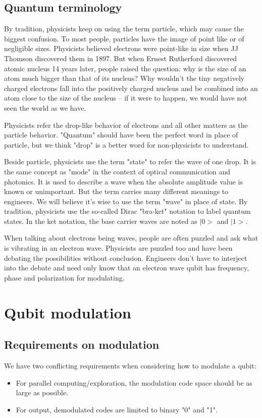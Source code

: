 \documentclass{book}
\begin{document}
\subsection{Quantum terminology}
By tradition, physicists keep on using the term particle, which may cause the biggest confusion. To most people, particles have the image of point like or of negligible sizes. Physicists believed electrons were point-like in size when JJ Thomson discovered them in 1897. But when Ernest Rutherford discovered atomic nucleus 14 years later, people raised the question: why is the size of an atom much bigger than that of its nucleus? Why wouldn't the tiny negatively charged electrons fall into the positively charged nucleus and be combined into an atom close to the size of the nucleus -- if it were to happen, we would have not seen the world as we have.

Physicists refer the drop-like behavior of electrons and all other matters as the particle behavior. "Quantum" should have been the perfect word in place of particle, but we think "drop" is a better word for non-physicists to understand.

Beside particle, physicists use the term "state" to refer the wave of one drop. It is the same concept as "mode" in the context of optical communication and photonics. It is used to describe a wave when the absolute amplitude value is known or unimportant. But the term carries many different meanings to engineers. We will believe it's wise to use the term "wave" in place of state. By tradition, physicists use the so-called Dirac "bra-ket" notation to label quantum states. In the ket notation, the base carrier waves are noted as $|0>$ and $|1>$.

When talking about electrons being waves, people are often puzzled and ask what is vibrating in an electron wave. Physicists are puzzled too and have been debating the possibilities without conclusion. Engineers don't have to interject into the debate and need only know that an electron wave qubit has frequency, phase and polarization for modulating.

\section{Qubit modulation}
\subsection{Requirements on modulation}
We have two conflicting requirements when considering how to modulate a qubit:
\begin{itemize}
    \item For parallel computing/exploration, the modulation code space should be as large as possible.
    \item For output, demodulated codes are limited to binary "0" and "1".
\end{itemize}
\end{document}
